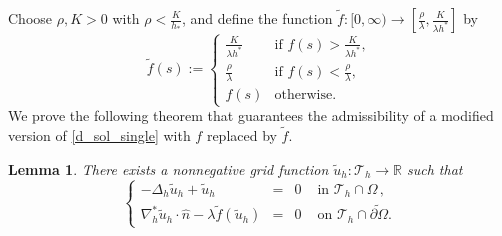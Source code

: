 \documentclass[12pt, reqno]{amsart}
\numberwithin{equation}{section}
\newtheorem{lem}{Lemma}[section]
\begin{document}
Choose $\rho, K > 0$ with $\rho < \frac{K}{h_*}$, 
and define the function $\widetilde{f}: [0,\infty) \to \left[ \frac{\rho}{\lambda},\frac{K}{\lambda h^*}\right]$ by 
\begin{equation}\label{f_tilde}
    \widetilde{f}(s) := \begin{cases}
        \frac{K}{\lambda h^*} & \text{if } f(s) > \frac{K}{\lambda h^*} , \\ 
        \frac{\rho}{\lambda} & \text{if } f(s) < \frac{\rho}{\lambda} , \\ 
        f(s) & \text{otherwise}. 
    \end{cases}
\end{equation}
We prove the following theorem that guarantees the admissibility of a modified version of \eqref{d_sol_single} with $f$ replaced by $\widetilde{f}$.
\begin{lem}\label{thm:admissibile}
There exists a nonnegative grid function $\widetilde{u}_h : \mathcal{T}_h \to \mathbb{R}$ such that 
\begin{equation}\label{d_sol_single_tilde}
    \left\lbrace\begin{array}{rcll}
    -\Delta_{h} \widetilde{u}_{h}+ \widetilde{u}_{h}&=&0 & \text{ in } \mathcal{T}_h \cap \Omega \,, \\
    \nabla_h^* \widetilde{u}_{h}  \cdot \widehat{n} - \lambda \widetilde{f}(\widetilde{u}_{h}  ) &=& 0 & \text{ on } \mathcal{T}_h \cap \widetilde{\partial \Omega} . 
    \end{array}\right.
\end{equation}    
\end{lem}
\end{document}
